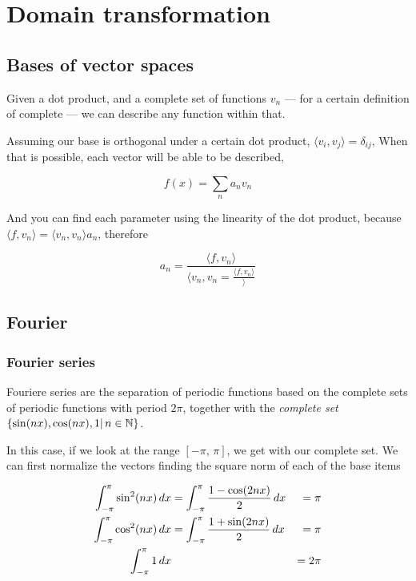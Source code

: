 \documentclass[../main/main.tex]{subfiles}
\begin{document}
\section{Domain transformation}

\subsection{Bases of vector spaces}

Given a dot product, and a complete set of functions ${v_{n}}$ --- for a certain definition of complete --- we can describe any function within that.

Assuming our base is orthogonal under a certain dot product, $\langle v_{i},v_{j}\!\rangle = \delta_{ij}$, When that is possible, each vector will be able to be described,

\begin{equation}
f(x) = \sum_{n}a_{n} v_{n}
\end{equation}

And you can find each parameter using the linearity of the dot product,  because $\langle f,\! v_{n}\rangle = \langle v_{n},\! v_{n}\rangle a_{n}$, therefore

\begin{equation}
a_{n} = \frac{\langle f,\! v_{n}\rangle}{\langle v_{n},\! v_{n} = \frac{\langle f,\! v_{n}\rangle}\rangle}
\end{equation}




\subsection{Fourier}


\subsubsection{Fourier series}

Fouriere series are the separation of periodic functions based on the complete sets  of periodic functions with period $2\pi$, together with the \emph{complete set} $\left\{\sin (nx), \cos(nx), 1 | \,n \in \mathbb{N}\right\}$.

	In this case, if we look at the range  $[-\pi,\, \pi]$, we get with our complete set. We can first normalize the vectors finding the square norm of each of the base items

	\begin{align}
	\fourierint{\sin^{2}(nx)} &=\fourierint{\frac{1-\cos(2nx)}{2}}  &=\pi  \\
	\fourierint{\cos^{2}(nx)} &=\fourierint{\frac{1+\sin(2nx)}{2}}  &=\pi  \\
	\fourierint{1} &&=2\pi
	\end{align}
\end{document}

